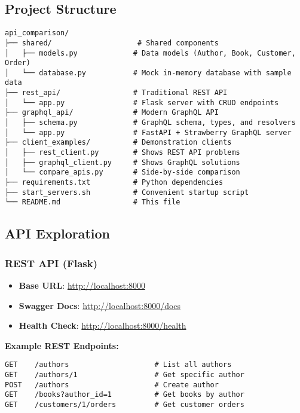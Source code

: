 \documentclass{article}
\begin{document}
\subsection{Project Structure}
\begin{verbatim}
api_comparison/
├── shared/                    # Shared components
│   ├── models.py             # Data models (Author, Book, Customer, Order)
│   └── database.py           # Mock in-memory database with sample data
├── rest_api/                 # Traditional REST API
│   └── app.py                # Flask server with CRUD endpoints
├── graphql_api/              # Modern GraphQL API
│   ├── schema.py             # GraphQL schema, types, and resolvers
│   └── app.py                # FastAPI + Strawberry GraphQL server
├── client_examples/          # Demonstration clients
│   ├── rest_client.py        # Shows REST API problems
│   ├── graphql_client.py     # Shows GraphQL solutions
│   └── compare_apis.py       # Side-by-side comparison
├── requirements.txt          # Python dependencies
├── start_servers.sh          # Convenient startup script
└── README.md                 # This file
\end{verbatim}

\subsection{API Exploration}
\subsubsection{REST API (Flask)}
\begin{itemize}
    \item \textbf{Base URL}: \url{http://localhost:8000}
    \item \textbf{Swagger Docs}: \url{http://localhost:8000/docs}
    \item \textbf{Health Check}: \url{http://localhost:8000/health}
\end{itemize}
\textbf{Example REST Endpoints:}
\begin{verbatim}
GET    /authors                    # List all authors
GET    /authors/1                  # Get specific author
POST   /authors                    # Create author
GET    /books?author_id=1          # Get books by author
GET    /customers/1/orders         # Get customer orders
\end{verbatim}
\end{document}
